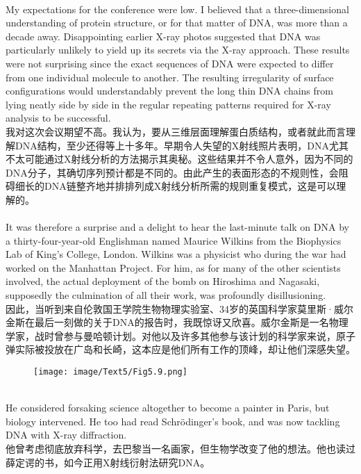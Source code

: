 \documentclass{article}
\begin{document}
\\
My expectations for the conference were low. I believed that a three-dimensional understanding of protein structure, or for that matter of DNA, was more than a decade away. Disappointing earlier X-ray photos suggested that DNA was particularly unlikely to yield up its secrets via the X-ray approach. These results were not surprising since the exact sequences of DNA were expected to differ from one individual molecule to another. The resulting irregularity of surface configurations would understandably prevent the long thin DNA chains from lying neatly side by side in the regular repeating patterns required for X-ray analysis to be successful.\\
我对这次会议期望不高。我认为，要从三维层面理解蛋白质结构，或者就此而言理解DNA结构，至少还得等上十多年。早期令人失望的X射线照片表明，DNA尤其不太可能通过X射线分析的方法揭示其奥秘。这些结果并不令人意外，因为不同的DNA分子，其确切序列预计都是不同的。由此产生的表面形态的不规则性，会阻碍细长的DNA链整齐地并排排列成X射线分析所需的规则重复模式，这是可以理解的。\\

\\
It was therefore a surprise and a delight to hear the last-minute talk on DNA by a thirty-four-year-old Englishman named Maurice Wilkins from the Biophysics Lab of King’s College, London. Wilkins was a physicist who during the war had worked on the Manhattan Project. For him, as for many of the other scientists involved, the actual deployment of the bomb on Hiroshima and Nagasaki, supposedly the culmination of all their work, was profoundly disillusioning.\\
因此，当听到来自伦敦国王学院生物物理实验室、34岁的英国科学家莫里斯·威尔金斯在最后一刻做的关于DNA的报告时，我既惊讶又欣喜。威尔金斯是一名物理学家，战时曾参与曼哈顿计划。对他以及许多其他参与该计划的科学家来说，原子弹实际被投放在广岛和长崎，这本应是他们所有工作的顶峰，却让他们深感失望。\\

\begin{figure}
    \centering
    \texttt{[image: image/Text5/Fig5.9.png]}
\end{figure}

\\
He considered forsaking science altogether to become a painter in Paris, but biology intervened. He too had read Schrödinger’s book, and was now tackling DNA with X-ray diffraction.\\
他曾考虑彻底放弃科学，去巴黎当一名画家，但生物学改变了他的想法。他也读过薛定谔的书，如今正用X射线衍射法研究DNA。\\
\end{document}
